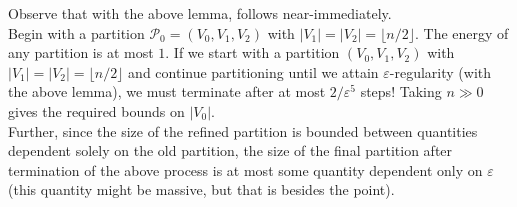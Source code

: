 \documentclass{article}
\begin{document}
			Observe that with the above lemma,  follows near-immediately.\\
			Begin with a partition $\mathcal{P}_0 = (V_0,V_1,V_2)$ with $|V_1| = |V_2| = \lfloor n/2\rfloor$.
			 The energy of any partition is at most $1$. If we start with a partition $(V_0,V_1,V_2)$ with $|V_1| = |V_2| = \lfloor n/2\rfloor$ and continue partitioning until we attain $\varepsilon$-regularity (with the above lemma), we must terminate after at most $2/\varepsilon^5$ steps! Taking $n\gg 0$ gives the required bounds on $|V_0|$.\\
			Further, since the size of the refined partition is bounded between quantities dependent solely on the old partition, the size of the final partition after termination of the above process is at most some quantity dependent only on $\varepsilon$ (this quantity might be massive, but that is besides the point).
\end{document}
